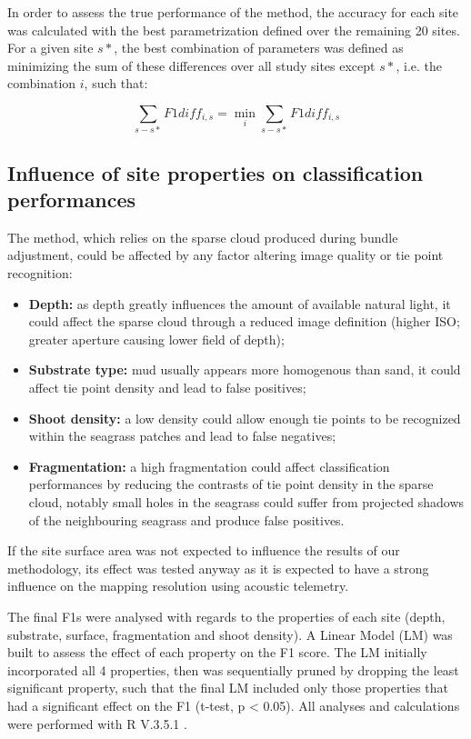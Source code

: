 In order to assess the true performance of the method, the accuracy for each site was calculated with the best parametrization defined over the remaining 20 sites. For a given site $s*$, the best combination of parameters was defined as minimizing the sum of these differences over all study sites except $s*$, i.e. the combination $i$, such that:


\begin{equation}
    \sum_{s-s*}{F1diff_{i,s}}=\min_i{\sum_{s-s*}{F1diff_{i,s}}}
    \label{eq3.5}
\end{equation}

\subsection{Influence of site properties on classification performances}
The method, which relies on the sparse cloud produced during bundle adjustment, could be affected by any factor altering image quality or tie point recognition:

\begin{itemize}
\item \textbf{Depth:} as depth greatly influences the amount of available natural light, it could affect the sparse cloud through a reduced image definition (higher ISO; greater aperture causing lower field of depth);
\item \textbf{Substrate type:} mud usually appears more homogenous than sand, it could affect tie point density and lead to false positives;
\item \textbf{Shoot density:} a low density could allow enough tie points to be recognized within the seagrass patches and lead to false negatives;
\item \textbf{Fragmentation:} a high fragmentation could affect classification performances by reducing the contrasts of tie point density in the sparse cloud, notably small holes in the seagrass could suffer from projected shadows of the neighbouring seagrass and produce false positives.
\end{itemize}

If the site surface area was not expected to influence the results of our methodology, its effect was tested anyway as it is expected to have a strong influence on the mapping resolution using acoustic telemetry.

The final F1s were analysed with regards to the properties of each site (depth, substrate, surface, fragmentation and shoot density). A Linear Model (LM) was built to assess the effect of each property on the F1 score. The LM initially incorporated all 4 properties, then was sequentially pruned by dropping the least significant property, such that the final LM included only those properties that had a significant effect on the F1 (t-test, p < 0.05). All analyses and calculations were performed with R V.3.5.1 \citep{r_core_team_r:_2018}.

